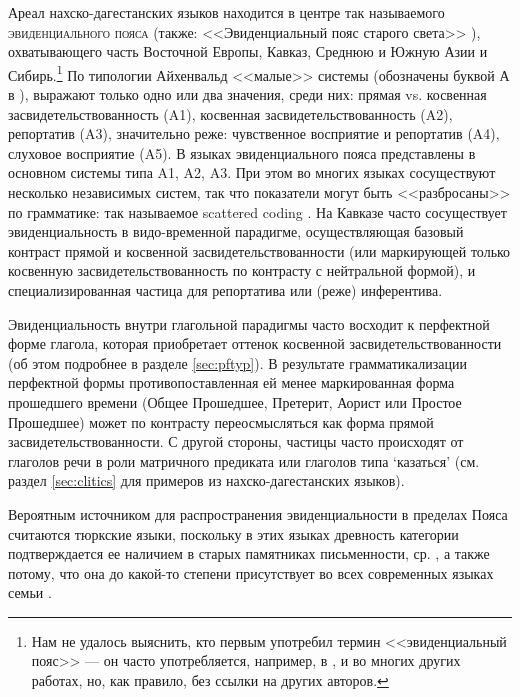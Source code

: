 Ареал нахско-дагестанских языков находится в центре так называемого \textsc{эвиденциального пояса} (также: <<Эвиденциальный пояс старого света>> \citep[63]{sumbatova1999}), охватывающего часть Восточной Европы, Кавказ, Среднюю и Южную Азии и Сибирь.\footnote{Нам не удалось выяснить, кто первым употребил термин <<эвиденциальный пояс>> --- он часто употребляется, например, в \citep[290]{aikhenvald2004}, \citep[19]{plungian2010} и во многих других работах, но, как правило, без ссылки на других авторов.} По типологии Айхенвальд <<малые>> системы (обозначены буквой А в \citep{aikhenvald2004}), выражают только одно или два значения, среди них: прямая vs. косвенная засвидетельствованность (A1), косвенная засвидетельствованность (A2), репортатив (A3), значительно реже: чувственное восприятие и репортатив (A4), слуховое восприятие (A5). В языках эвиденциального пояса представлены в основном системы типа A1, A2, A3. При этом во многих языках сосуществуют несколько независимых систем, так что показатели могут быть <<разбросаны>> по грамматике: так называемое scattered coding \citep[8--11]{aikhenvald2003}. На Кавказе часто сосуществует эвиденциальность в видо-временной парадигме, осуществляющая базовый контраст прямой и косвенной засвидетельствованности (или маркирующей только косвенную засвидетельствованность по контрасту с нейтральной формой), и специализированная частица для репортатива или (реже) инферентива. 
\par Эвиденциальность внутри глагольной парадигмы часто восходит к перфектной форме глагола, которая приобретает оттенок косвенной засвидетельствованности (об этом подробнее в разделе \ref{sec:pftyp}). В результате грамматикализации перфектной формы противопоставленная ей менее маркированная форма прошедшего времени (Общее Прошедшее, Претерит, Аорист или Простое Прошедшее) может по контрасту переосмысляться как форма прямой засвидетельствованности. С другой стороны, частицы часто происходят от глаголов речи в роли матричного предиката или глаголов типа `казаться' (см. раздел \ref{sec:clitics} для примеров из нахско-дагестанских языков).
\par Вероятным источником для распространения эвиденциальности в пределах Пояса считаются тюркские языки, поскольку в этих языках древность категории подтверждается ее наличием в старых памятниках письменности, ср. \citep[273]{erdal2004}, а также потому, что она до какой-то степени присутствует во всех современных языках семьи \citep[510--511]{johanson2018}.
